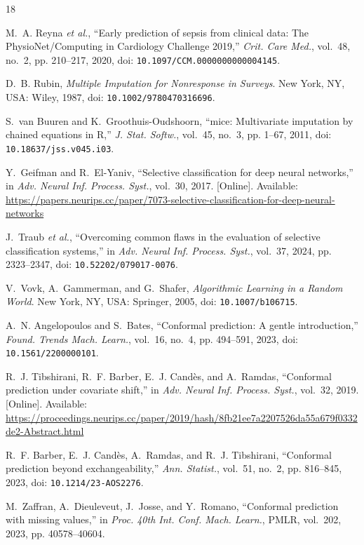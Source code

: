 \documentclass[conference]{IEEEtran}
\begin{document}
\begin{thebibliography}{18}
\providecommand{\doi}[1]{doi: \nolinkurl{#1}}

M.~A. Reyna \emph{et al.}, ``Early prediction of sepsis from clinical data: The PhysioNet/Computing in Cardiology Challenge 2019,'' \emph{Crit. Care Med.}, vol.~48, no.~2, pp. 210--217, 2020, \doi{10.1097/CCM.0000000000004145}.

D.~B. Rubin, \emph{Multiple Imputation for Nonresponse in Surveys}. New York, NY, USA: Wiley, 1987, \doi{10.1002/9780470316696}.

S.~van Buuren and K.~Groothuis-Oudshoorn, ``mice: Multivariate imputation by chained equations in R,'' \emph{J. Stat. Softw.}, vol.~45, no.~3, pp. 1--67, 2011, \doi{10.18637/jss.v045.i03}.

Y.~Geifman and R.~El-Yaniv, ``Selective classification for deep neural networks,'' in \emph{Adv. Neural Inf. Process. Syst.}, vol.~30, 2017. [Online]. Available: \url{https://papers.neurips.cc/paper/7073-selective-classification-for-deep-neural-networks}

J.~Traub \emph{et al.}, ``Overcoming common flaws in the evaluation of selective classification systems,'' in \emph{Adv. Neural Inf. Process. Syst.}, vol.~37, 2024, pp. 2323--2347, \doi{10.52202/079017-0076}.

V.~Vovk, A.~Gammerman, and G.~Shafer, \emph{Algorithmic Learning in a Random World}. New York, NY, USA: Springer, 2005, \doi{10.1007/b106715}.

A.~N. Angelopoulos and S.~Bates, ``Conformal prediction: A gentle introduction,'' \emph{Found. Trends Mach. Learn.}, vol.~16, no.~4, pp. 494--591, 2023, \doi{10.1561/2200000101}.

R.~J. Tibshirani, R.~F. Barber, E.~J. Cand\`es, and A.~Ramdas, ``Conformal prediction under covariate shift,'' in \emph{Adv. Neural Inf. Process. Syst.}, vol.~32, 2019. [Online]. Available: \url{https://proceedings.neurips.cc/paper/2019/hash/8fb21ee7a2207526da55a679f0332de2-Abstract.html}

R.~F. Barber, E.~J. Cand\`es, A.~Ramdas, and R.~J. Tibshirani, ``Conformal prediction beyond exchangeability,'' \emph{Ann. Statist.}, vol.~51, no.~2, pp. 816--845, 2023, \doi{10.1214/23-AOS2276}.

M.~Zaffran, A.~Dieuleveut, J.~Josse, and Y.~Romano, ``Conformal prediction with missing values,'' in \emph{Proc. 40th Int. Conf. Mach. Learn.}, PMLR, vol.~202, 2023, pp. 40578--40604.


\end{thebibliography}
\end{document}
